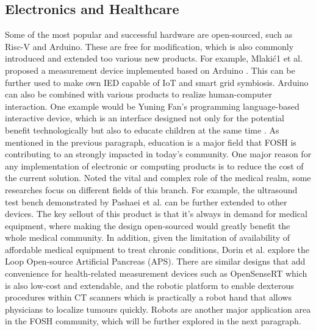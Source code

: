 \documentclass[final-report.tex]{subfiles}
\begin{document}
\subsection{Electronics and Healthcare}
Some of the most popular and successful hardware are open-sourced, such as Risc-V and Arduino. 
These are free for modification, which is also commonly introduced and extended too various new products. 
For example, Mlakić1 et al. proposed a measurement device implemented based on Arduino \cite{mlakic2019open}. This can be further used to make own IED capable of IoT and smart grid symbiosis. Arduino can also be combined with various products to realize human-computer interaction. 
One example would be Yuning Fan's programming language-based interactive device, which is an interface designed not only for the potential benefit technologically but also to educate children at the same time \cite{fan2021open}. 
As mentioned in the previous paragraph, education is a major field that FOSH is contributing to an strongly impacted in today's community.  
One major reason for any implementation of electronic or computing products is to reduce the cost of the current solution. Noted the vital and complex role of the medical realm, some researches  focus on different fields of this branch. 
For example, the ultrasound test bench demonstrated by Pashaei et al. can be further extended to other devices. 
The key sellout of this product is that it's always in demand for medical equipment, where making the design open-sourced would greatly benefit the whole medical community. 
In addition, given the limitation of availability of affordable medical equipment to treat chronic conditions, Dorin et al. explore the Loop Open-source Artificial Pancreas (APS).
There are similar designs that add convenience for health-related measurement devices such as OpenSenseRT which is also low-cost and extendable,
and the robotic platform to enable dexterous procedures within CT scanners which is practically a robot hand that allows physicians to localize tumours quickly. Robots are another major application area in the FOSH community, which will be further explored in the next paragraph. 
\end{document}
